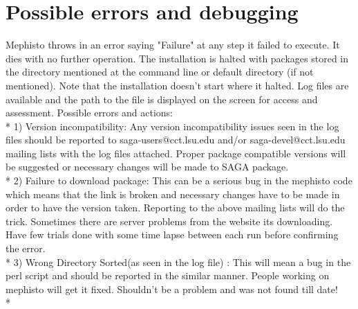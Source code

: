 \documentclass[a4paper,10pt]{article}
\begin{document}
\section*{Possible errors and debugging} 
Mephisto throws in an error saying "Failure" at any step it failed to execute. 
It dies with no further operation. The installation is halted with packages stored 
in the directory mentioned at the command line or default directory (if not mentioned).
Note that the installation doesn't start where it halted. Log files are available and the
path to the file is displayed on the screen for access and assessment. 
Possible errors and actions: \\*
1) Version incompatibility: Any version incompatibility issues seen in the 
log files should be reported to saga-users@cct.lsu.edu and/or 
saga-devel@cct.lsu.edu mailing lists with the log files attached. 
Proper package compatible versions will be suggested or necessary changes 
will be made to SAGA package.\\*
2) Failure to download package: This can be a serious bug in the mephisto code which means 
that the link is broken and necessary changes have to be made in order to have the version
taken. Reporting to the above mailing lists will do the trick. Sometimes there are server
problems from the website its downloading. Have few trials done with some time
lapse between each run before confirming the error. \\*
3) Wrong Directory Sorted(as seen in the log file) : This will mean a bug in the perl script 
and should be reported in the similar manner. People working on mephisto will get it fixed. 
Shouldn't be a problem and was not found till date! \\*

 
  
 
\end{document}
